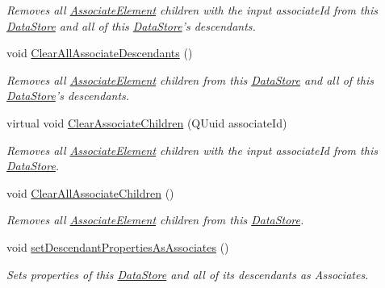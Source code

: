 \begin{DoxyCompactItemize}
\begin{DoxyCompactList}\small\item\em Removes all \hyperlink{class_picto_1_1_associate_element}{Associate\-Element} children with the input associate\-Id from this \hyperlink{class_picto_1_1_data_store}{Data\-Store} and all of this \hyperlink{class_picto_1_1_data_store}{Data\-Store}'s descendants. \end{DoxyCompactList}\item 
\hypertarget{class_picto_1_1_data_store_a4bb792f5bf63de9f929f49d1b9500ea8}{void \hyperlink{class_picto_1_1_data_store_a4bb792f5bf63de9f929f49d1b9500ea8}{Clear\-All\-Associate\-Descendants} ()}\label{class_picto_1_1_data_store_a4bb792f5bf63de9f929f49d1b9500ea8}

\begin{DoxyCompactList}\small\item\em Removes all \hyperlink{class_picto_1_1_associate_element}{Associate\-Element} children from this \hyperlink{class_picto_1_1_data_store}{Data\-Store} and all of this \hyperlink{class_picto_1_1_data_store}{Data\-Store}'s descendants. \end{DoxyCompactList}\item 
\hypertarget{class_picto_1_1_data_store_a340c4d3fe20a1011002918820893192c}{virtual void \hyperlink{class_picto_1_1_data_store_a340c4d3fe20a1011002918820893192c}{Clear\-Associate\-Children} (Q\-Uuid associate\-Id)}\label{class_picto_1_1_data_store_a340c4d3fe20a1011002918820893192c}

\begin{DoxyCompactList}\small\item\em Removes all \hyperlink{class_picto_1_1_associate_element}{Associate\-Element} children with the input associate\-Id from this \hyperlink{class_picto_1_1_data_store}{Data\-Store}. \end{DoxyCompactList}\item 
\hypertarget{class_picto_1_1_data_store_aaa85e975a50ee2dd49dea4a9e3d4d0e8}{void \hyperlink{class_picto_1_1_data_store_aaa85e975a50ee2dd49dea4a9e3d4d0e8}{Clear\-All\-Associate\-Children} ()}\label{class_picto_1_1_data_store_aaa85e975a50ee2dd49dea4a9e3d4d0e8}

\begin{DoxyCompactList}\small\item\em Removes all \hyperlink{class_picto_1_1_associate_element}{Associate\-Element} children from this \hyperlink{class_picto_1_1_data_store}{Data\-Store}. \end{DoxyCompactList}\item 
void \hyperlink{class_picto_1_1_data_store_a655139d741217c40a7654a0587af1325}{set\-Descendant\-Properties\-As\-Associates} ()
\begin{DoxyCompactList}\small\item\em Sets properties of this \hyperlink{class_picto_1_1_data_store}{Data\-Store} and all of its descendants as Associates. \end{DoxyCompactList}\end{DoxyCompactItemize}

